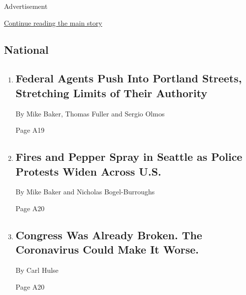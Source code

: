 Advertisement

\protect\hyperlink{after-mid2}{Continue reading the main story}

\hypertarget{national}{%
\subsection{National}\label{national}}

\begin{enumerate}
\def\labelenumi{\arabic{enumi}.}
\item
  \href{/2020/07/25/us/portland-federal-legal-jurisdiction-courts.html}{}

  \hypertarget{federal-agents-push-into-portland-streets-stretching-limits-of-their-authority}{%
  \subsection{Federal Agents Push Into Portland Streets, Stretching
  Limits of Their
  Authority}\label{federal-agents-push-into-portland-streets-stretching-limits-of-their-authority}}

  By Mike Baker, Thomas Fuller and Sergio Olmos

  Page A19
\item
  \href{/2020/07/25/us/protests-seattle-portland.html}{}

  \hypertarget{fires-and-pepper-spray-in-seattle-as-police-protests-widen-across-us}{%
  \subsection{Fires and Pepper Spray in Seattle as Police Protests Widen
  Across
  U.S.}\label{fires-and-pepper-spray-in-seattle-as-police-protests-widen-across-us}}

  By Mike Baker and Nicholas Bogel-Burroughs

  Page A20
\item
  \href{/2020/07/25/us/congress-broken-partisanship-coronavirus.html}{}

  \hypertarget{congress-was-already-broken-the-coronavirus-could-make-it-worse}{%
  \subsection{Congress Was Already Broken. The Coronavirus Could Make It
  Worse.}\label{congress-was-already-broken-the-coronavirus-could-make-it-worse}}

  By Carl Hulse

  Page A20
\end{enumerate}

